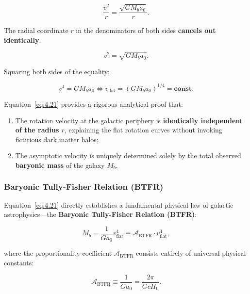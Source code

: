 \documentclass[11pt,a4paper]{article}
\theoremstyle{definition}
\begin{document}
\begin{equation}\label{eq:4.19}\tag{4.19}
\frac{v^2}{r} = \frac{\sqrt{G M_b a_0}}{r}.
\end{equation}

The radial coordinate $r$ in the denominators of both sides \textbf{cancels out identically}:

\begin{equation}\label{eq:4.20}\tag{4.20}
v^2 = \sqrt{G M_b a_0}.
\end{equation}

Squaring both sides of the equality:

\begin{equation}\label{eq:4.21}\tag{4.21}
v^4 = G M_b a_0 \iff v_{\text{flat}} = \left( G M_b a_0 \right)^{1/4} = \mathbf{\text{const}}.
\end{equation}

Equation~\eqref{eq:4.21} provides a rigorous analytical proof that:

\begin{enumerate}
\item The rotation velocity at the galactic periphery is \textbf{identically independent of the radius $r$}, explaining the flat rotation curves without invoking fictitious dark matter halos;
\item The asymptotic velocity is uniquely determined solely by the total observed \textbf{baryonic mass} of the galaxy $M_b$.
\end{enumerate}


\subsubsection{Baryonic Tully-Fisher Relation (BTFR)}\label{sec:4.2.3}

Equation~\eqref{eq:4.21} directly establishes a fundamental physical law of galactic astrophysics---the \textbf{Baryonic Tully-Fisher Relation (BTFR)}:

\begin{equation}\label{eq:4.22}\tag{4.22}
M_b = \frac{1}{G a_0} v_{\text{flat}}^4 \equiv \mathcal{A}_{\text{BTFR}} \cdot v_{\text{flat}}^4,
\end{equation}

where the proportionality coefficient $\mathcal{A}_{\text{BTFR}}$ consists entirely of universal physical constants:

\begin{equation}\label{eq:4.23}\tag{4.23}
\mathcal{A}_{\text{BTFR}} \equiv \frac{1}{G a_0} = \frac{2\pi}{G c H_0}.
\end{equation}
\end{document}
